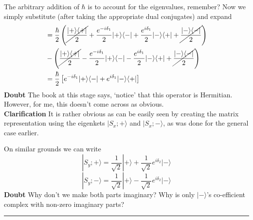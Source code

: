 \documentclass[12pt]{article}
\def\ket#1{|#1 \rangle}
\def\oupr#1#2{| #1 \rangle \langle #2 |}
\begin{document}
				The arbitrary addition of $\hbar$ is to account for the eigenvalues, remember? Now we simply substitute (after taking the appropriate dual conjugates) and expand
				\begin{align}
					&=\frac \hbar 2 \left({\cancel{\frac{\oupr ++}2}} + \frac {e^{-i\delta_1}} 2 \oupr + - + \frac {e^{i\delta_1}} 2 \oupr - + + {\cancel{\frac{\oupr --} 2}} \right) \\
					&- \left({\cancel{\frac{\oupr ++}2}} - \frac {e^{-i\delta_1}} 2 \oupr + - - \frac {e^{i\delta_1}} 2 \oupr - + + {\cancel{\frac{\oupr --} 2}} \right) \\
					&=\frac \hbar 2 \left[e^{-i\delta_1} \oupr + - + e^{i\delta_1}\oupr - + \right]
				\end{align}
				{\bf Doubt} The book at this stage says, `notice' that this operator is Hermitian. However, for me, this doesn't come across as obvious.\\
				{\bf Clarification} It is rather obvious as can be easily seen by creating the matrix representation using the eigenkets $\ket {S_x; +}$ and $\ket {S_x; -}$, as was done for the general case earlier.
				\par
				On similar grounds we can write
				\begin{equation}
					\ket {S_y; +} = \frac 1 {\sqrt 2} \ket + + \frac 1 {\sqrt 2} e^{i\delta_2} \ket {-}
				\end{equation}
				\begin{equation}
					\ket {S_y;-} = \frac 1 {\sqrt 2} \ket + - \frac 1 {\sqrt 2} e^{i\delta_2} \ket {-}
				\end{equation}
				{\bf Doubt} Why don't we make both parts imaginary? Why is only $\ket -$'s co-efficient complex with non-zero imaginary parts?
				 
\vspace{12pt}
\hrule
\end{document}
